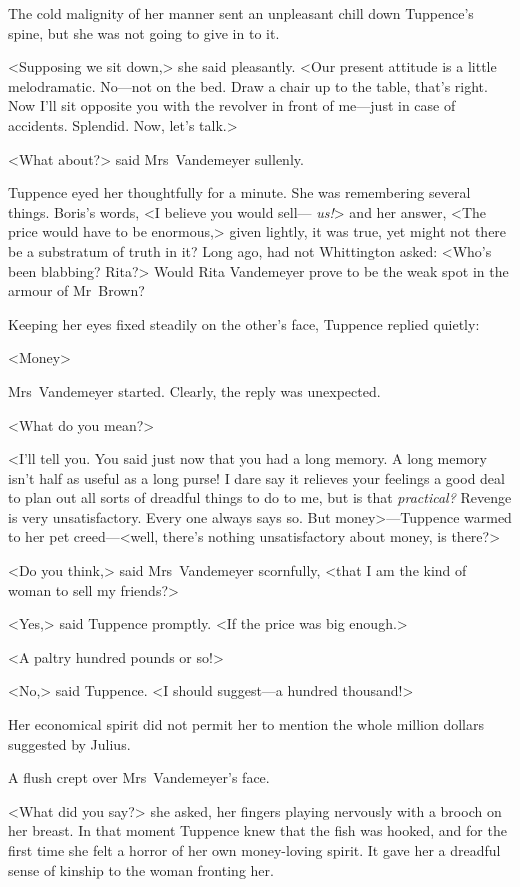 The cold malignity of her manner sent an unpleasant chill down Tuppence's spine, but she was not going to give in to it.

<Supposing we sit down,> she said pleasantly. <Our present attitude is a little melodramatic. No—not on the bed. Draw a chair up to the table, that's right. Now I'll sit opposite you with the revolver in front of me—just in case of accidents. Splendid. Now, let's talk.>

<What about?> said Mrs~Vandemeyer sullenly.

Tuppence eyed her thoughtfully for a minute. She was remembering several things. Boris's words, <I believe you would sell— \emph{us!}> and her answer, <The price would have to be enormous,> given lightly, it was true, yet might not there be a substratum of truth in it? Long ago, had not Whittington asked: <Who's been blabbing? Rita?> Would Rita Vandemeyer prove to be the weak spot in the armour of Mr~Brown?

Keeping her eyes fixed steadily on the other's face, Tuppence replied quietly:

<Money\longdash>

Mrs~Vandemeyer started. Clearly, the reply was unexpected.

<What do you mean?>

<I'll tell you. You said just now that you had a long memory. A long memory isn't half as useful as a long purse! I dare say it relieves your feelings a good deal to plan out all sorts of dreadful things to do to me, but is that \emph{practical?} Revenge is very unsatisfactory. Every one always says so. But money>—Tuppence warmed to her pet creed—<well, there's nothing unsatisfactory about money, is there?>

<Do you think,> said Mrs~Vandemeyer scornfully, <that I am the kind of woman to sell my friends?>

<Yes,> said Tuppence promptly. <If the price was big enough.>

<A paltry hundred pounds or so!>

<No,> said Tuppence. <I should suggest—a hundred thousand!>

Her economical spirit did not permit her to mention the whole million dollars suggested by Julius.

A flush crept over Mrs~Vandemeyer's face.

<What did you say?> she asked, her fingers playing nervously with a brooch on her breast. In that moment Tuppence knew that the fish was hooked, and for the first time she felt a horror of her own money-loving spirit. It gave her a dreadful sense of kinship to the woman fronting her.

